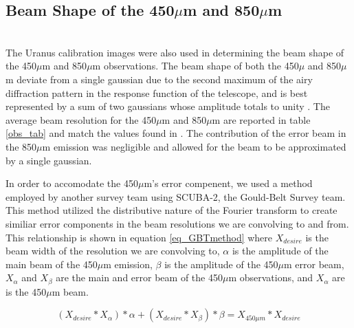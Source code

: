 \subsection{Beam Shape of the 450$\mu$m and 850$\mu$m} \\
The Uranus calibration images were also used in determining the beam shape of the 450$\mu$m and 850$\mu$m observations.  The beam shape of both the 450$\mu$ and 850$\mu$m deviate from a single gaussian due to the second maximum of the airy diffraction pattern in the response function of the telescope, and is best represented by a sum of two gaussians whose amplitude totals to unity \citet{dempsey2013}.  The average beam resolution for the 450$\mu$m and 850$\mu$m are reported in table \ref{obs_tab} and match the values found in \citet{dempsey2013}.  The contribution of the error beam in the 850$\mu$m emission was negligible and allowed for the beam to be approximated by a single gaussian.

In order to accomodate the 450$\mu$m's error compenent, we used a method employed by another survey team using SCUBA-2, the Gould-Belt Survey team.  This method utilized the distributive nature of the Fourier transform to create similiar error components in the beam resolutions we are convolving to and from.  This relationship is shown in equation \ref{eq_GBTmethod} where $X_{desire}$ is the beam width of the resolution we are convolving to, $\alpha$ is the amplitude of the main beam of the 450$\mu$m emission, $\beta$ is the amplitude of the 450$\mu$m error beam, $X_{\alpha}$ and $X_{\beta}$ are the main and error beam of the 450$\mu$m observations, and $X_{\alpha}$ are is the 450$\mu$m beam.

\begin{equation}\label{eq_GBTmethod}

\left(X_{desire} \ast X_{\alpha}\right)*\alpha + \left(X_{desire} \ast X_{\beta}\right)*\beta = X_{450\mu m} \ast X_{desire}

\end{equation}





